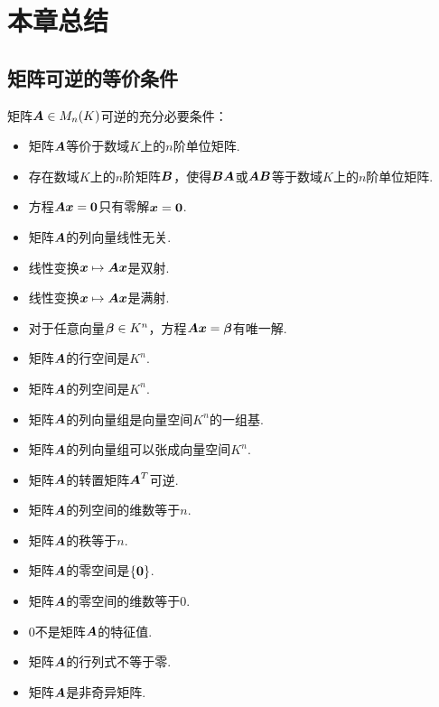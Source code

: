 \section{本章总结}
\subsection*{矩阵可逆的等价条件}
矩阵\(\boldsymbol{A} \in M_n(K)\)可逆的充分必要条件：\begin{itemize}
	\item 矩阵\(\boldsymbol{A}\)等价于数域\(K\)上的\(n\)阶单位矩阵.
	\item 存在数域\(K\)上的\(n\)阶矩阵\(\boldsymbol{B}\)，使得\(\boldsymbol{B}\boldsymbol{A}\)或\(\boldsymbol{A}\boldsymbol{B}\)等于数域\(K\)上的\(n\)阶单位矩阵.
	\item 方程\(\boldsymbol{A}\boldsymbol{x}=\boldsymbol0\)只有零解\(\boldsymbol{x}=\boldsymbol0\).
	\item 矩阵\(\boldsymbol{A}\)的列向量线性无关.
	\item 线性变换\(\boldsymbol{x} \mapsto \boldsymbol{A}\boldsymbol{x}\)是双射.
	\item 线性变换\(\boldsymbol{x} \mapsto \boldsymbol{A}\boldsymbol{x}\)是满射.
	\item 对于任意向量\(\boldsymbol\beta \in K^n\)，方程\(\boldsymbol{A}\boldsymbol{x}=\boldsymbol\beta\)有唯一解.
	\item 矩阵\(\boldsymbol{A}\)的行空间是\(K^n\).
	\item 矩阵\(\boldsymbol{A}\)的列空间是\(K^n\).
	\item 矩阵\(\boldsymbol{A}\)的列向量组是向量空间\(K^n\)的一组基.
	\item 矩阵\(\boldsymbol{A}\)的列向量组可以张成向量空间\(K^n\).
	\item 矩阵\(\boldsymbol{A}\)的转置矩阵\(\boldsymbol{A}^T\)可逆.
	\item 矩阵\(\boldsymbol{A}\)的列空间的维数等于\(n\).
	\item 矩阵\(\boldsymbol{A}\)的秩等于\(n\).
	\item 矩阵\(\boldsymbol{A}\)的零空间是\(\{\boldsymbol0\}\).
	\item 矩阵\(\boldsymbol{A}\)的零空间的维数等于\(0\).
	\item \(0\)不是矩阵\(\boldsymbol{A}\)的特征值.
	\item 矩阵\(\boldsymbol{A}\)的行列式不等于零.
	\item 矩阵\(\boldsymbol{A}\)是非奇异矩阵.
\end{itemize}

